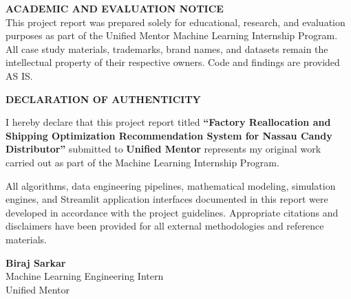 \documentclass[12pt]{article}
\begin{document}
\begin{titlepage}
    \vfill
    
    \begin{minipage}{0.92\textwidth}
        \centering
        \fontsize{10}{13}\selectfont
        \textbf{ACADEMIC AND EVALUATION NOTICE}\\[4pt]
        This project report was prepared solely for educational, research, and evaluation purposes as part of the Unified Mentor Machine Learning Internship Program. All case study materials, trademarks, brand names, and datasets remain the intellectual property of their respective owners. Code and findings are provided AS IS.
    \end{minipage}
    
    \vspace*{0.5cm}
\end{titlepage}

\setcounter{page}{2}

\begin{center}
    {\fontsize{16}{20}\selectfont\bfseries DECLARATION OF AUTHENTICITY\par}
\end{center}
\vspace{0.5cm}

I hereby declare that this project report titled \textbf{``Factory Reallocation and Shipping Optimization Recommendation System for Nassau Candy Distributor''} submitted to \textbf{Unified Mentor} represents my original work carried out as part of the Machine Learning Internship Program.

All algorithms, data engineering pipelines, mathematical modeling, simulation engines, and Streamlit application interfaces documented in this report were developed in accordance with the project guidelines. Appropriate citations and disclaimers have been provided for all external methodologies and reference materials.

\vspace{1.5cm}
\begin{flushright}
    \textbf{Biraj Sarkar}\\
    Machine Learning Engineering Intern\\
    Unified Mentor
\end{flushright}
\end{document}
